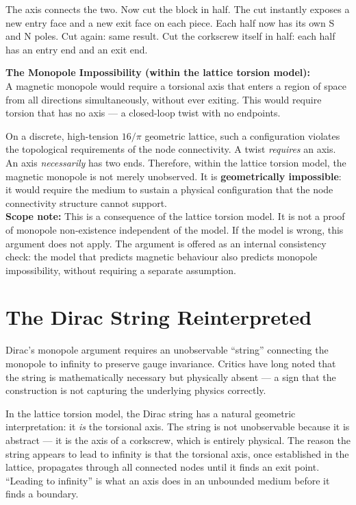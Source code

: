 \documentclass[11pt, letterpaper, openany]{book}
\begin{document}
The axis connects the two. Now cut the block in half. The cut instantly
exposes a new entry face and a new exit face on each piece. Each half now
has its own S and N poles. Cut again: same result. Cut the corkscrew
itself in half: each half has an entry end and an exit end.

\begin{monopolebox}
\textbf{The Monopole Impossibility (within the lattice torsion model):}\\[0.5em]
A magnetic monopole would require a torsional axis that enters a region of
space from all directions simultaneously, without ever exiting. This would
require torsion that has no axis --- a closed-loop twist with no endpoints.

On a discrete, high-tension $16/\pi$ geometric lattice, such a
configuration violates the topological requirements of the node connectivity.
A twist \emph{requires} an axis. An axis \emph{necessarily} has two ends.
Therefore, within the lattice torsion model, the magnetic monopole is
not merely unobserved. It is \textbf{geometrically impossible}: it
would require the medium to sustain a physical configuration that the
node connectivity structure cannot support.\\[0.5em]
\textbf{Scope note:} This is a consequence of the lattice torsion model.
It is not a proof of monopole non-existence independent of the model.
If the model is wrong, this argument does not apply. The argument is
offered as an internal consistency check: the model that predicts
magnetic behaviour also predicts monopole impossibility, without
requiring a separate assumption.
\end{monopolebox}

\section{The Dirac String Reinterpreted}

Dirac's monopole argument requires an unobservable ``string'' connecting
the monopole to infinity to preserve gauge invariance. Critics have
long noted that the string is mathematically necessary but physically
absent --- a sign that the construction is not capturing the underlying
physics correctly.

In the lattice torsion model, the Dirac string has a natural geometric
interpretation: it \emph{is} the torsional axis. The string is not
unobservable because it is abstract --- it is the axis of a corkscrew,
which is entirely physical. The reason the string appears to lead to
infinity is that the torsional axis, once established in the lattice,
propagates through all connected nodes until it finds an exit point.
``Leading to infinity'' is what an axis does in an unbounded medium
before it finds a boundary.
\end{document}
